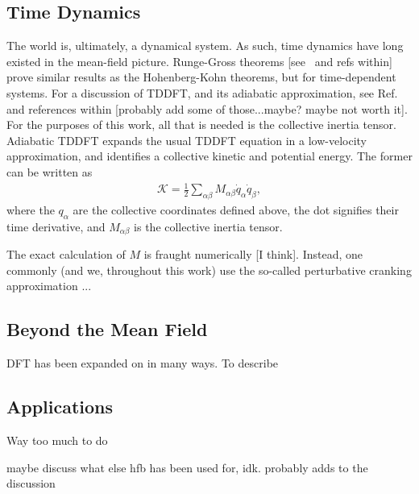 \documentclass[../thesis.tex]{subfiles}
\begin{document}
\subsection{Time Dynamics}
The world is, ultimately, a dynamical system. As such, time dynamics have long existed in the mean-field picture. Runge-Gross theorems [see~\cite{Schunck2016} and refs within] prove similar results as the Hohenberg-Kohn theorems, but for time-dependent systems. For a discussion of TDDFT, and its adiabatic approximation, see Ref.~\cite{Schunck2016} and references within [probably add some of those...maybe? maybe not worth it]. For the purposes of this work, all that is needed is the collective inertia tensor. Adiabatic TDDFT expands the usual TDDFT equation in a low-velocity approximation, and identifies a collective kinetic and potential energy. The former can be written as
\begin{align}
	\mathcal{K}=\frac{1}{2}\sum_{\alpha\beta}M_{\alpha\beta}\dot{q}_\alpha\dot{q}_\beta,
\end{align}
where the $q_\alpha$ are the collective coordinates defined above, the dot signifies their time derivative, and $M_{\alpha\beta}$ is the collective inertia tensor.

The exact calculation of $M$ is fraught numerically [I think]. Instead, one commonly (and we, throughout this work) use the so-called perturbative cranking approximation ...

\subsection{Beyond the Mean Field}
DFT has been expanded on in many ways. To describe

\subsection{Applications}
Way too much to do



maybe discuss what else hfb has been used for, idk. probably adds to the discussion

\end{document}
